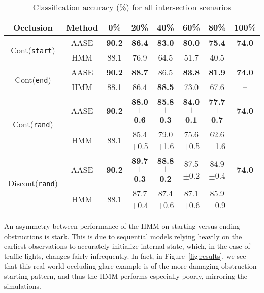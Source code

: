 \documentclass[letterpaper,10pt,conference]{ieeeconf}
\begin{document}
\begin{table}[t]
    \scriptsize
    \caption{Classification accuracy (\%) for all intersection scenarios}
    \setlength{\tabcolsep}{2.7pt}
    \begin{tabularx}{\linewidth}{cccccccc}
        \toprule
        Occlusion & Method & 0\% & 20\% & 40\% & 60\% & 80\% & 100\%\\
        \midrule
        \multirow{2}{*}{Cont(\texttt{start})} & \textsc{AASE} & \textbf{90.2} & \textbf{86.4} & \textbf{83.0} & \textbf{80.0} & \textbf{75.4} & \textbf{74.0} \\
        & \textsc{HMM} & 88.1 & 76.9 & 64.5 & 51.7 & 40.5 & -- \\
        \midrule
        \multirow{2}{*}{Cont(\texttt{end})} & \textsc{AASE} & \textbf{90.2} & \textbf{88.7} & 86.5 & \textbf{83.8} & \textbf{81.9} & \textbf{74.0} \\
        & \textsc{HMM} & 88.1 & 86.4 & \textbf{88.5} & 73.0 & 67.6 & -- \\
        \midrule
        \multirow{2}{*}{Cont(\texttt{rand})} & \textsc{AASE} & \textbf{90.2} & \textbf{88.0$\boldsymbol{\pm}$0.6} & \textbf{85.8$\boldsymbol{\pm}$0.3} & \textbf{84.0$\boldsymbol{\pm}$0.1} & \textbf{77.7$\boldsymbol{\pm}$0.7} & \textbf{74.0} \\
        & \textsc{HMM} & 88.1 & 85.4$\pm$0.5 & 79.0$\pm$1.6 & 75.6$\pm$0.5 & 62.6$\pm$1.6 & -- \\
        \midrule
        \multirow{2}{*}{Discont(\texttt{rand})} & \textsc{AASE} & \textbf{90.2} & \textbf{89.7$\boldsymbol{\pm}$0.3} & \textbf{88.8$\boldsymbol{\pm}$0.2} & 87.5$\pm$0.2 & 84.9$\pm$0.4 & \textbf{74.0} \\
        & \textsc{HMM} & 88.1 & 87.7$\pm$0.4 & 87.4$\pm$0.6 & 87.1$\pm$0.6 & 85.9$\pm$0.9 & -- \\
        \bottomrule
    \end{tabularx}
    \label{table:results}
\end{table}

An asymmetry between performance of the HMM on starting versus ending obstructions is stark. This is due to sequential models relying heavily on the earliest observations to accurately initialize internal state, which, in the case of traffic lights, changes fairly infrequently. In fact, in Figure~\ref{fig:results}, we see that this real-world occluding glare example is of the more damaging obstruction starting pattern, and thus the HMM performs especially poorly, mirroring the simulations.
\end{document}
